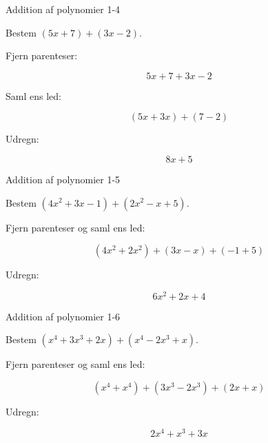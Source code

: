 \documentclass{article}
\begin{document}
\newpage

\begin{exercise}{Addition af polynomier 1-4}

Bestem $(5x + 7) + (3x - 2)$.


\hint

Fjern parenteser:

\hint
\[
5x + 7 + 3x - 2
\]

\hint

Saml ens led:

\hint
\[
(5x + 3x) + (7 - 2)
\]

\hint

Udregn:

\hint
\[
8x + 5
\]

\end{exercise}

\newpage

\begin{exercise}{Addition af polynomier 1-5}

Bestem $(4x^2 + 3x - 1) + (2x^2 - x + 5)$.


\hint

Fjern parenteser og saml ens led:

\hint
\[
(4x^2 + 2x^2) + (3x - x) + (-1 + 5)
\]

\hint

Udregn:

\hint
\[
6x^2 + 2x + 4
\]

\end{exercise}

\newpage

\begin{exercise}{Addition af polynomier 1-6}

Bestem $(x^4 + 3x^3 + 2x) + (x^4 - 2x^3 + x)$.


\hint

Fjern parenteser og saml ens led:

\hint
\[
(x^4 + x^4) + (3x^3 - 2x^3) + (2x + x)
\]

\hint

Udregn:

\hint
\[
2x^4 + x^3 + 3x
\]

\end{exercise}
\end{document}
